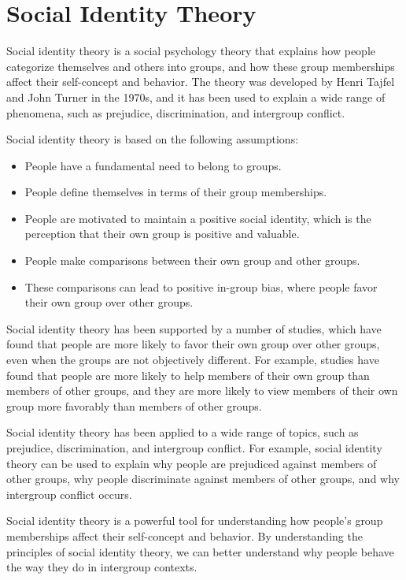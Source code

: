 \documentclass[
  b5paper]{book}
\begin{document}
\hypertarget{social-identity-theory}{%
\section{Social Identity Theory}\label{social-identity-theory}}

Social identity theory is a social psychology theory that explains how people categorize themselves and others into groups, and how these group memberships affect their self-concept and behavior. The theory was developed by Henri Tajfel and John Turner in the 1970s, and it has been used to explain a wide range of phenomena, such as prejudice, discrimination, and intergroup conflict.

Social identity theory is based on the following assumptions:

\begin{itemize}
\item
  People have a fundamental need to belong to groups.
\item
  People define themselves in terms of their group memberships.
\item
  People are motivated to maintain a positive social identity, which is the perception that their own group is positive and valuable.
\item
  People make comparisons between their own group and other groups.
\item
  These comparisons can lead to positive in-group bias, where people favor their own group over other groups.
\end{itemize}

Social identity theory has been supported by a number of studies, which have found that people are more likely to favor their own group over other groups, even when the groups are not objectively different. For example, studies have found that people are more likely to help members of their own group than members of other groups, and they are more likely to view members of their own group more favorably than members of other groups.

Social identity theory has been applied to a wide range of topics, such as prejudice, discrimination, and intergroup conflict. For example, social identity theory can be used to explain why people are prejudiced against members of other groups, why people discriminate against members of other groups, and why intergroup conflict occurs.

Social identity theory is a powerful tool for understanding how people's group memberships affect their self-concept and behavior. By understanding the principles of social identity theory, we can better understand why people behave the way they do in intergroup contexts.
\end{document}
